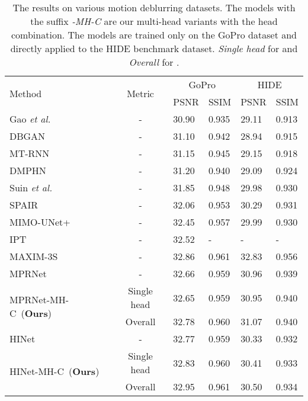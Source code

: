 \documentclass[letterpaper]{article} \usepackage{aaai23}  \usepackage{times}  \usepackage{helvet}  \usepackage{courier}  \usepackage[hyphens]{url}  \usepackage{graphicx} \urlstyle{rm} \def\UrlFont{\rm}  \usepackage{natbib}  \usepackage{caption} \frenchspacing  \setlength{\pdfpagewidth}{8.5in} \setlength{\pdfpageheight}{11in} \usepackage{algorithm}
\begin{document}
\newcommand\unknowna{\multicolumn{2}{c|}{-}}
\newcommand\unknownb{\multicolumn{2}{c}{-}}
\begin{table*}[t]
\centering
\caption{The results on various motion deblurring datasets. The models with the suffix \textit{-MH-C} are our multi-head variants with the head combination. The models are trained only on the GoPro dataset and directly applied to the HIDE benchmark dataset. \textit{Single head} for  and \textit{Overall} for .}
\label{tab:result}
\begin{tabular}{l|c|ll|ll}\toprule
\multirow{2}{*}{Method}& \multirow{2}{*}{Metric} & \multicolumn{2}{c|}{GoPro} & \multicolumn{2}{c}{HIDE} \\ && PSNR & SSIM & PSNR & SSIM \\ \midrule Gao \textit{et al.}~\cite{gao2019dynamic}      &           - & 30.90 & 0.935 & 29.11 & 0.913 \\ DBGAN~\cite{zhang2020deblurring}               &           - & 31.10 & 0.942 & 28.94 & 0.915 \\ MT-RNN~\cite{park2020multi}                    &           - & 31.15 & 0.945 & 29.15 & 0.918 \\ DMPHN~\cite{zhang2019deep}                     &           - & 31.20 & 0.940 & 29.09 & 0.924 \\ Suin \textit{et al.}~\cite{suin2020spatially}  &           - & 31.85 & 0.948 & 29.98 & 0.930 \\ SPAIR~\cite{purohit2021spatially}              &           - & 32.06 & 0.953 & 30.29 & 0.931 \\ MIMO-UNet+~\cite{cho2021rethinking}            &           - & 32.45 & 0.957 & 29.99 & 0.930 \\ IPT~\cite{chen2021pre}                         &           - & 32.52 &\quad- &\quad- &\quad- \\ MAXIM-3S~\cite{tu2022maxim}                    &           - & 32.86 & 0.961 & 32.83 & 0.956 \\ \midrule
MPRNet~\cite{zamir2021multi}                   &           - & 32.66 & 0.959 & 30.96 & 0.939 \\ \multirow{2}{*}{MPRNet-MH-C~(\textbf{Ours})}   & Single head & 32.65 & 0.959 & 30.95 & 0.940 \\ &     Overall & 32.78 & 0.960 & 31.07 & 0.940 \\ \midrule
HINet~\cite{chen2021hinet}                     &           - & 32.77 & 0.959 & 30.33 & 0.932 \\ \multirow{2}{*}{HINet-MH-C~(\textbf{Ours})}    & Single head & 32.83 & 0.960 & 30.41 & 0.933 \\ &     Overall & 32.95 & 0.961 & 30.50 & 0.934 \\ \midrule

\end{tabular}
\end{table*}
\end{document}
